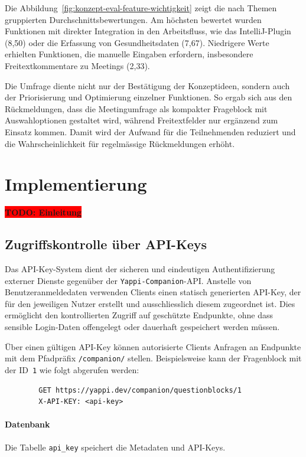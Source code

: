 \documentclass[12pt,a4paper]{report}
\newcommand{\todo}[1]{\colorbox{red}{\textbf{TODO: #1}}\\}
\begin{document}
Die Abbildung~\ref{fig:konzept-eval-feature-wichtigkeit} zeigt die nach Themen gruppierten Durchschnittsbewertungen.
Am höchsten bewertet wurden Funktionen mit direkter Integration in den Arbeitsfluss, wie das IntelliJ-Plugin (8,50)
oder die Erfassung von Gesundheitsdaten (7,67).
Niedrigere Werte erhielten Funktionen, die manuelle Eingaben erfordern, insbesondere Freitextkommentare zu Meetings (2,33).

Die Umfrage diente nicht nur der Bestätigung der Konzeptideen, sondern auch der Priorisierung und Optimierung einzelner Funktionen.
So ergab sich aus den Rückmeldungen, dass die Meetingumfrage als kompakter Frageblock mit Auswahloptionen gestaltet wird,
während Freitextfelder nur ergänzend zum Einsatz kommen.
Damit wird der Aufwand für die Teilnehmenden reduziert und die Wahrscheinlichkeit für regelmässige Rückmeldungen erhöht.

\chapter{Implementierung}
\todo{Einleitung}

\section{Zugriffskontrolle über API-Keys}

    Das API-Key-System dient der sicheren und eindeutigen Authentifizierung externer Dienste gegenüber der \texttt{Yappi-Companion}-API.
    Anstelle von Benutzeranmeldedaten verwenden Clients einen statisch generierten API-Key, der für den jeweiligen Nutzer erstellt und ausschliesslich diesem zugeordnet ist.
    Dies ermöglicht den kontrollierten Zugriff auf geschützte Endpunkte, ohne dass sensible Login-Daten offengelegt oder dauerhaft gespeichert werden müssen.

    Über einen gültigen API-Key können autorisierte Clients Anfragen an Endpunkte mit dem Pfadpräfix \texttt{/companion/} stellen.
    Beispielsweise kann der Fragenblock mit der ID~\texttt{1} wie folgt abgerufen werden:

    \begin{verbatim}
        GET https://yappi.dev/companion/questionblocks/1
        X-API-KEY: <api-key>
    \end{verbatim}


    \subsubsection{Datenbank}
    Die Tabelle \texttt{api\_key} speichert die Metadaten und API-Keys.
\end{document}
